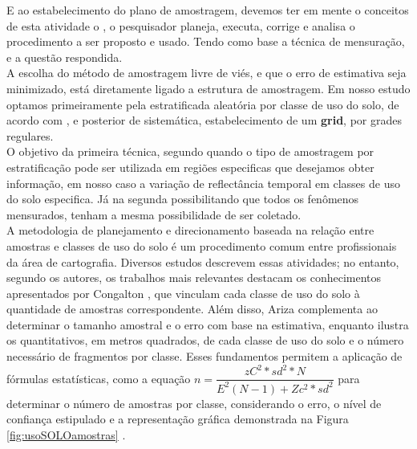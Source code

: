   \hspace*{1.25 cm} E ao estabelecimento do plano de amostragem, devemos ter em mente o conceitos de esta atividade o  \cite[p.2]{Bolfarine1},  o pesquisador planeja, executa, corrige e analisa o procedimento a ser proposto e usado. Tendo como base a técnica de mensuração, e a questão respondida.\\
% 
  \hspace*{1.25 cm} A escolha do método de amostragem livre de viés, e que o erro de estimativa seja minimizado, está diretamente ligado a estrutura de amostragem.  Em nosso estudo optamos primeiramente pela estratificada aleatória por classe de uso do solo, de acordo com \cite[p.191]{Ariza}, e  posterior  de  sistemática, estabelecimento de um \textbf{grid}, por grades regulares.\\
  \hspace*{1.25 cm}  O objetivo da primeira técnica, segundo  \cite[p.22]{Lohr} quando o tipo de amostragem por estratificação pode ser utilizada em regiões especificas que desejamos obter informação, em nosso caso a variação de reflectância temporal em classes de uso do solo especifica. Já na segunda  possibilitando que todos os fenômenos mensurados, tenham a mesma possibilidade de ser coletado.\\


 \hspace*{1.25 cm} A metodologia de planejamento e direcionamento baseada na relação entre amostras e classes de uso do solo é um procedimento comum entre profissionais da área de cartografia. Diversos estudos descrevem essas atividades; no entanto, segundo os autores, os trabalhos mais relevantes destacam os conhecimentos apresentados por Congalton \cite[p.79]{Congalton}, que vinculam cada classe de uso do solo à quantidade de amostras correspondente. Além disso, Ariza \cite[p.135]{Ariza} complementa ao determinar o tamanho amostral e o erro com base na estimativa, enquanto \cite[p.192-196]{Ariza} ilustra os quantitativos, em metros quadrados, de cada classe de uso do solo e o número necessário de fragmentos por classe. Esses fundamentos permitem a aplicação de fórmulas estatísticas, como a equação \( n= \dfrac{zC ^{2} * sd^{2}* N}{ E^{2}(N-1) + Zc^{2}*sd^{2}} \) para determinar o número de amostras por classe, considerando o erro, o nível de confiança estipulado e a representação gráfica demonstrada na Figura \ref{fig:usoSOLOamostras}  .\\
    

